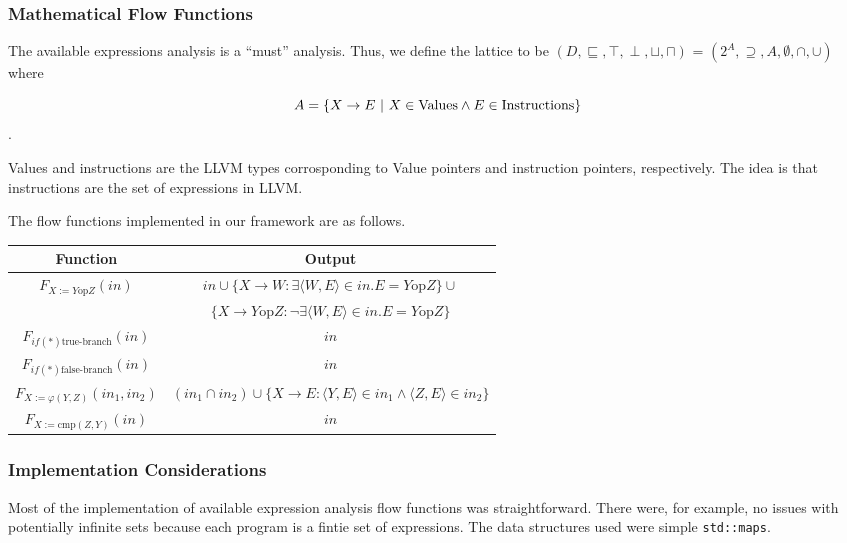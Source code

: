 \documentclass{article}
\theoremstyle{definition}
\begin{document}
\subsubsection{Mathematical Flow Functions}
The available expressions analysis is a ``must'' analysis. Thus, we
define the lattice to be $(D, \sqsubseteq, \top, \perp, \sqcup,
\sqcap)$ = $(2^A, \supseteq, A, \emptyset, \cap, \cup)$ where

\[ A = \{X \rightarrow E~|~X \in \textup{Values} \wedge E \in \textup{Instructions}\} \].

Values and instructions are the LLVM types corrosponding to Value
pointers and instruction pointers, respectively. The idea is that
instructions are the set of expressions in LLVM.

The flow functions implemented in our framework are as follows.

\begin{center}
\begin{tabular}{c | c} %
Function & Output \\ [0.5ex] %
\hline %
$F_{X:= Y \text{op} Z}(in)$ & $in \cup \{ X \rightarrow W : \exists \langle W, E\rangle \in in.  E = Y \text{op} Z\} \cup$ \\
& $\{ X \rightarrow Y \text{op} Z : \neg\exists \langle W, E\rangle \in in.  E = Y \text{op} Z\}$\\
$F_{if(*) \text{true-branch}}(in)$ & $in$ \\ 
$F_{if(*) \text{false-branch}}(in)$ & $in$ \\ 
$F_{X := \varphi(Y,Z)}(in_1, in_2)$ & $(in_1 \cap in_2) \cup \{X \rightarrow E : \langle Y, E \rangle \in in_1 \wedge \langle Z,E \rangle \in in_2 \}$\\
$F_{X := \text{cmp}(Z,Y)}(in)$ & $in$\\
 [1ex] %
\hline %
\end{tabular} 
\end{center}
\subsubsection{Implementation Considerations}
Most of the implementation of available expression analysis flow
functions was straightforward. There were, for example, no issues with
potentially infinite sets because each program is a fintie set of
expressions. The data structures used were simple
\texttt{std::maps}. 
\end{document}
